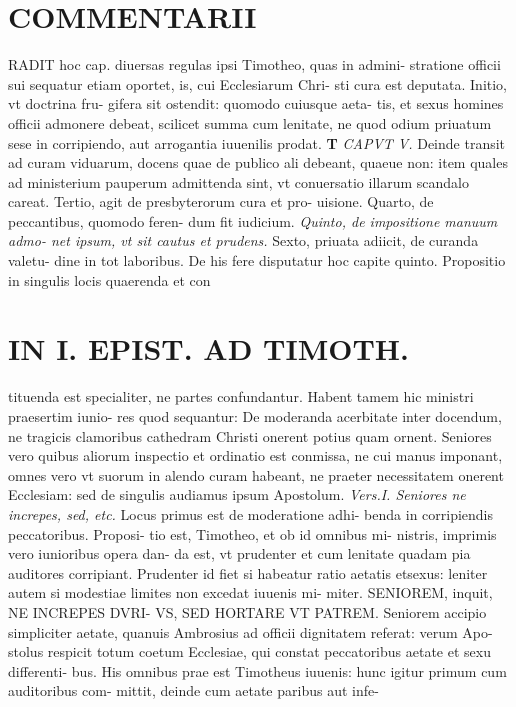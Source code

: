 \documentclass{article}
\begin{document}
\begin{pages}
\section*{COMMENTARII }
\marginpar{[ p.116 ]}\pstart RADIT hoc cap. diuersas regulas ipsi Timotheo, quas in admini- stratione officii sui sequatur etiam oportet, is, cui Ecclesiarum Chri- sti cura est deputata. Initio, vt doctrina fru- gifera sit ostendit: quomodo cuiusque aeta- tis, et sexus homines officii admonere debeat, scilicet summa cum lenitate, ne quod odium priuatum sese in corripiendo, aut arrogantia iuuenilis prodat.  \pend
\textbf{T }
\textit{CAPVT V. }\pstart Deinde transit ad curam viduarum, docens quae de publico ali debeant, quaeue non: item quales ad ministerium pauperum admittenda sint, vt conuersatio illarum scandalo careat.  \pend\pstart Tertio, agit de presbyterorum cura et pro- uisione.  \pend\pstart Quarto, de peccantibus, quomodo feren- dum fit iudicium.  \pend
\textit{Quinto, de impositione manuum admo- net ipsum, vt sit cautus et prudens. }\pstart Sexto, priuata adiicit, de curanda valetu- dine in tot laboribus. De his fere disputatur hoc capite quinto.  \pend\pstart Propositio in singulis locis quaerenda et con  \pend
\section*{IN I. EPIST. AD TIMOTH. }
\marginpar{[ p.117 ]}\pstart tituenda est specialiter, ne partes confundantur. Habent tamem hic ministri praesertim iunio- res quod sequantur: De moderanda acerbitate inter docendum, ne tragicis clamoribus  cathedram Christi onerent potius quam ornent. Seniores vero quibus aliorum inspectio et ordinatio est conmissa, ne cui manus imponant, omnes vero vt suorum in alendo curam habeant, ne praeter necessitatem onerent Ecclesiam: sed de singulis audiamus ipsum Apostolum.  \pend
\textit{Vers.I. Seniores ne increpes, sed, etc. }\pstart Locus primus est de moderatione adhi- benda in corripiendis peccatoribus. Proposi- tio est, Timotheo, et ob id omnibus mi- nistris, imprimis vero iunioribus opera dan- da est, vt prudenter et cum lenitate quadam pia auditores corripiant. Prudenter id fiet si habeatur ratio aetatis etsexus: leniter autem si modestiae limites non excedat iuuenis mi- miter.  \pend\pstart SENIOREM, inquit, NE INCREPES DVRI- VS, SED HORTARE VT PATREM. Seniorem accipio simpliciter aetate, quanuis Ambrosius ad officii dignitatem referat: verum Apo- stolus respicit totum coetum Ecclesiae, qui constat peccatoribus aetate et sexu differenti- bus. His omnibus prae est Timotheus iuuenis: hunc igitur primum cum auditoribus com- mittit, deinde cum aetate paribus aut infe-  \pend

\end{pages}
\end{document}

